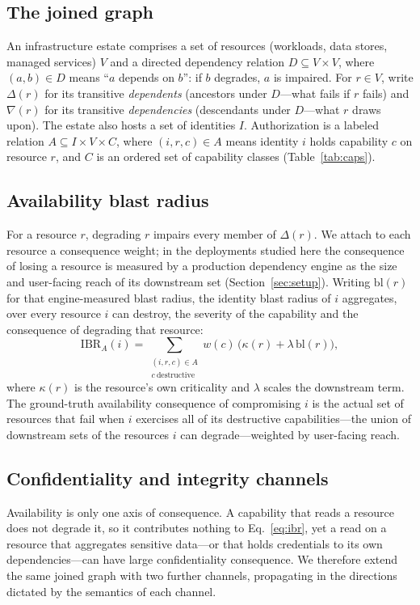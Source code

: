 \documentclass[conference]{IEEEtran}
\begin{document}
\subsection{The joined graph}
An infrastructure estate comprises a set of resources (workloads, data stores,
managed services) $V$ and a directed dependency relation $D \subseteq V \times V$,
where $(a,b) \in D$ means ``$a$ depends on $b$'': if $b$ degrades, $a$ is impaired.
For $r \in V$, write $\Delta(r)$ for its transitive \emph{dependents} (ancestors
under $D$---what fails if $r$ fails) and $\nabla(r)$ for its transitive
\emph{dependencies} (descendants under $D$---what $r$ draws upon). The estate also
hosts a set of identities $I$. Authorization is a labeled relation $A \subseteq I
\times V \times C$, where $(i,r,c) \in A$ means identity $i$ holds capability $c$ on
resource $r$, and $C$ is an ordered set of capability classes (Table~\ref{tab:caps}).

\subsection{Availability blast radius}
For a resource $r$, degrading $r$ impairs every member of $\Delta(r)$. We attach to
each resource a consequence weight; in the deployments studied here the consequence
of losing a resource is measured by a production dependency engine as the size and
user-facing reach of its downstream set (Section~\ref{sec:setup}). Writing
$\mathrm{bl}(r)$ for that engine-measured blast radius, the identity blast radius of
$i$ aggregates, over every resource $i$ can destroy, the severity of the capability
and the consequence of degrading that resource:
\begin{equation}
\mathrm{IBR}_A(i) = \!\!\!\sum_{\substack{(i,r,c)\in A\\ c\ \text{destructive}}}\!\!\!
 w(c)\,\bigl(\kappa(r) + \lambda\,\mathrm{bl}(r)\bigr),
\label{eq:ibr}
\end{equation}
where $\kappa(r)$ is the resource's own criticality and $\lambda$ scales the
downstream term. The ground-truth availability consequence of compromising $i$ is
the actual set of resources that fail when $i$ exercises all of its destructive
capabilities---the union of downstream sets of the resources $i$ can
degrade---weighted by user-facing reach.

\subsection{Confidentiality and integrity channels}
\label{sec:ci}
Availability is only one axis of consequence. A capability that reads a resource
does not degrade it, so it contributes nothing to Eq.~\eqref{eq:ibr}, yet a read on
a resource that aggregates sensitive data---or that holds credentials to its own
dependencies---can have large confidentiality consequence. We therefore extend the
same joined graph with two further channels, propagating in the directions dictated
by the semantics of each channel.
\end{document}

